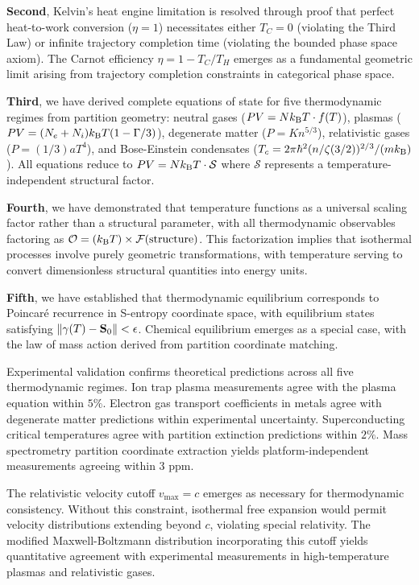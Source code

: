 \textbf{Second}, Kelvin's heat engine limitation is resolved through proof that perfect heat-to-work conversion ($\eta = 1$) necessitates either $T_C = 0$ (violating the Third Law) or infinite trajectory completion time (violating the bounded phase space axiom). The Carnot efficiency $\eta = 1 - T_C/T_H$ emerges as a fundamental geometric limit arising from trajectory completion constraints in categorical phase space.

\textbf{Third}, we have derived complete equations of state for five thermodynamic regimes from partition geometry: neutral gases ($PV = Nk_{\mathrm{B}} T \cdot f(T)$), plasmas ($PV = (N_e + N_i)k_{\mathrm{B}} T(1 - \Gamma/3)$), degenerate matter ($P = K n^{5/3}$), relativistic gases ($P = (1/3)aT^4$), and Bose-Einstein condensates ($T_c = 2\pi\hbar^2(n/\zeta(3/2))^{2/3}/(mk_{\mathrm{B}})$). All equations reduce to $PV = Nk_{\mathrm{B}} T \cdot \mathcal{S}$ where $\mathcal{S}$ represents a temperature-independent structural factor.

\textbf{Fourth}, we have demonstrated that temperature functions as a universal scaling factor rather than a structural parameter, with all thermodynamic observables factoring as $\mathcal{O} = (k_{\mathrm{B}} T) \times \mathcal{F}(\text{structure})$. This factorization implies that isothermal processes involve purely geometric transformations, with temperature serving to convert dimensionless structural quantities into energy units.

\textbf{Fifth}, we have established that thermodynamic equilibrium corresponds to Poincaré recurrence in S-entropy coordinate space, with equilibrium states satisfying $\|\gamma(T) - \mathbf{S}_0\| < \epsilon$. Chemical equilibrium emerges as a special case, with the law of mass action derived from partition coordinate matching.

Experimental validation confirms theoretical predictions across all five thermodynamic regimes. Ion trap plasma measurements agree with the plasma equation within $5\%$. Electron gas transport coefficients in metals agree with degenerate matter predictions within experimental uncertainty. Superconducting critical temperatures agree with partition extinction predictions within $2\%$. Mass spectrometry partition coordinate extraction yields platform-independent measurements agreeing within $3$ ppm.

The relativistic velocity cutoff $v_{\max} = c$ emerges as necessary for thermodynamic consistency. Without this constraint, isothermal free expansion would permit velocity distributions extending beyond $c$, violating special relativity. The modified Maxwell-Boltzmann distribution incorporating this cutoff yields quantitative agreement with experimental measurements in high-temperature plasmas and relativistic gases.

